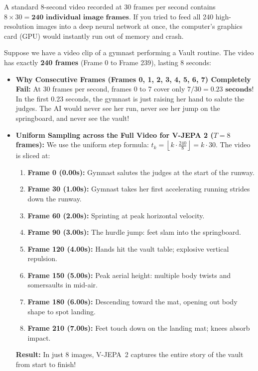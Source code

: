 \documentclass[a4paper, 11pt]{article}
\begin{document}
\begin{conceptbox}
A standard 8-second video recorded at 30 frames per second contains $8 \times 30 = \mathbf{240\text{ individual image frames}}$. 
If you tried to feed all 240 high-resolution images into a deep neural network at once, the computer's graphics card (GPU) would instantly run out of memory and crash.
\end{conceptbox}

\begin{examplebox}
Suppose we have a video clip of a gymnast performing a Vault routine. The video has exactly \textbf{240 frames} (Frame 0 to Frame 239), lasting 8 seconds:

\begin{itemize}
    \item \textbf{Why Consecutive Frames (Frames 0, 1, 2, 3, 4, 5, 6, 7) Completely Fail:}
    At 30 frames per second, frames 0 to 7 cover only $7 / 30 = \mathbf{0.23\text{ seconds}}$! In the first 0.23 seconds, the gymnast is just raising her hand to salute the judges. The AI would never see her run, never see her jump on the springboard, and never see the vault!
    
    \item \textbf{Uniform Sampling across the Full Video for V-JEPA 2 ($T=8$ frames):}
    We use the uniform step formula: $t_k = \left\lfloor k \cdot \frac{240}{8} \right\rfloor = k \cdot 30$. The video is sliced at:
    \begin{enumerate}
        \item \textbf{Frame 0 (0.00s):} Gymnast salutes the judges at the start of the runway.
        \item \textbf{Frame 30 (1.00s):} Gymnast takes her first accelerating running strides down the runway.
        \item \textbf{Frame 60 (2.00s):} Sprinting at peak horizontal velocity.
        \item \textbf{Frame 90 (3.00s):} The hurdle jump: feet slam into the springboard.
        \item \textbf{Frame 120 (4.00s):} Hands hit the vault table; explosive vertical repulsion.
        \item \textbf{Frame 150 (5.00s):} Peak aerial height: multiple body twists and somersaults in mid-air.
        \item \textbf{Frame 180 (6.00s):} Descending toward the mat, opening out body shape to spot landing.
        \item \textbf{Frame 210 (7.00s):} Feet touch down on the landing mat; knees absorb impact.
    \end{enumerate}
    \textbf{Result:} In just 8 images, V-JEPA~2 captures the entire story of the vault from start to finish!


\end{itemize}
\end{examplebox}
\end{document}

